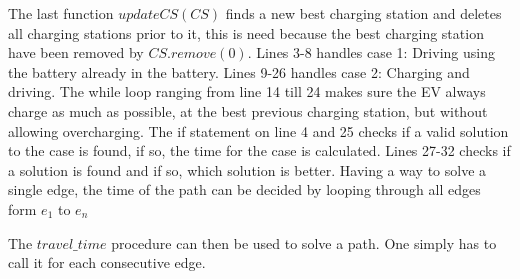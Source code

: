 The last function $updateCS(CS)$ finds a new best charging station and deletes all charging stations prior to it, this is need because the best charging station have been removed by $CS.remove(0)$. Lines 3-8 handles case 1: Driving using the battery already in the battery. Lines 9-26 handles case 2: Charging and driving. The while loop ranging from line 14 till 24 makes sure the EV always charge as much as possible, at the best previous charging station, but without allowing overcharging. The if statement on line 4 and 25 checks if a valid solution to the case is found, if so, the time for the case is calculated. Lines 27-32 checks if a solution is found and if so, which solution is better. Having a way to solve a single edge, the time of the path can be decided by looping through all edges form $e_1$ to $e_n$

The $travel\_time$ procedure can then be used to solve a path. One simply has to call it for each consecutive edge.


